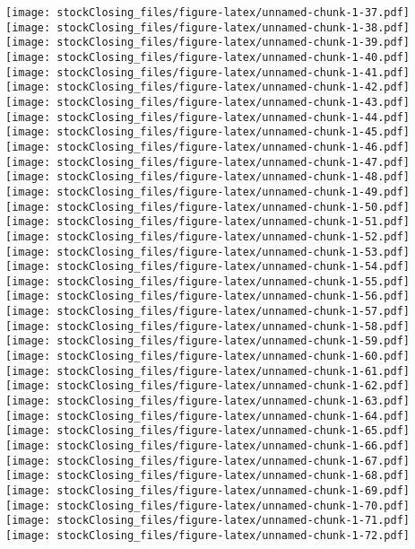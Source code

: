 \documentclass[]{article}
\begin{document}
\texttt{[image: stockClosing\_files/figure-latex/unnamed-chunk-1-37.pdf]}
\texttt{[image: stockClosing\_files/figure-latex/unnamed-chunk-1-38.pdf]}
\texttt{[image: stockClosing\_files/figure-latex/unnamed-chunk-1-39.pdf]}
\texttt{[image: stockClosing\_files/figure-latex/unnamed-chunk-1-40.pdf]}
\texttt{[image: stockClosing\_files/figure-latex/unnamed-chunk-1-41.pdf]}
\texttt{[image: stockClosing\_files/figure-latex/unnamed-chunk-1-42.pdf]}
\texttt{[image: stockClosing\_files/figure-latex/unnamed-chunk-1-43.pdf]}
\texttt{[image: stockClosing\_files/figure-latex/unnamed-chunk-1-44.pdf]}
\texttt{[image: stockClosing\_files/figure-latex/unnamed-chunk-1-45.pdf]}
\texttt{[image: stockClosing\_files/figure-latex/unnamed-chunk-1-46.pdf]}
\texttt{[image: stockClosing\_files/figure-latex/unnamed-chunk-1-47.pdf]}
\texttt{[image: stockClosing\_files/figure-latex/unnamed-chunk-1-48.pdf]}
\texttt{[image: stockClosing\_files/figure-latex/unnamed-chunk-1-49.pdf]}
\texttt{[image: stockClosing\_files/figure-latex/unnamed-chunk-1-50.pdf]}
\texttt{[image: stockClosing\_files/figure-latex/unnamed-chunk-1-51.pdf]}
\texttt{[image: stockClosing\_files/figure-latex/unnamed-chunk-1-52.pdf]}
\texttt{[image: stockClosing\_files/figure-latex/unnamed-chunk-1-53.pdf]}
\texttt{[image: stockClosing\_files/figure-latex/unnamed-chunk-1-54.pdf]}
\texttt{[image: stockClosing\_files/figure-latex/unnamed-chunk-1-55.pdf]}
\texttt{[image: stockClosing\_files/figure-latex/unnamed-chunk-1-56.pdf]}
\texttt{[image: stockClosing\_files/figure-latex/unnamed-chunk-1-57.pdf]}
\texttt{[image: stockClosing\_files/figure-latex/unnamed-chunk-1-58.pdf]}
\texttt{[image: stockClosing\_files/figure-latex/unnamed-chunk-1-59.pdf]}
\texttt{[image: stockClosing\_files/figure-latex/unnamed-chunk-1-60.pdf]}
\texttt{[image: stockClosing\_files/figure-latex/unnamed-chunk-1-61.pdf]}
\texttt{[image: stockClosing\_files/figure-latex/unnamed-chunk-1-62.pdf]}
\texttt{[image: stockClosing\_files/figure-latex/unnamed-chunk-1-63.pdf]}
\texttt{[image: stockClosing\_files/figure-latex/unnamed-chunk-1-64.pdf]}
\texttt{[image: stockClosing\_files/figure-latex/unnamed-chunk-1-65.pdf]}
\texttt{[image: stockClosing\_files/figure-latex/unnamed-chunk-1-66.pdf]}
\texttt{[image: stockClosing\_files/figure-latex/unnamed-chunk-1-67.pdf]}
\texttt{[image: stockClosing\_files/figure-latex/unnamed-chunk-1-68.pdf]}
\texttt{[image: stockClosing\_files/figure-latex/unnamed-chunk-1-69.pdf]}
\texttt{[image: stockClosing\_files/figure-latex/unnamed-chunk-1-70.pdf]}
\texttt{[image: stockClosing\_files/figure-latex/unnamed-chunk-1-71.pdf]}
\texttt{[image: stockClosing\_files/figure-latex/unnamed-chunk-1-72.pdf]}
\end{document}

